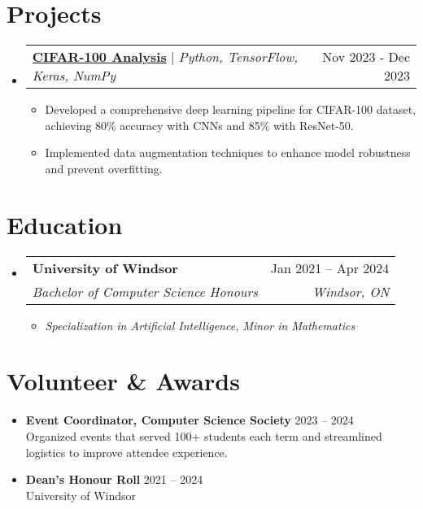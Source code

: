 \documentclass[letterpaper,11pt]{article}
\makeatletter
\newcommand{\resumeItem}[1]{
  \item\small{
    {#1 \vspace{-2pt}}
  }
}
\newcommand{\resumeSubheading}[4]{
  \vspace{-2pt}\item
    \begin{tabular*}{0.97\textwidth}[t]{l@{\extracolsep{\fill}}r}
      \textbf{#1} & #2 \\
      \textit{\small#3} & \textit{\small #4} \\
    \end{tabular*}\vspace{-7pt}
}
\newcommand{\resumeProjectHeading}[2]{
    \item
    \begin{tabular*}{0.97\textwidth}{l@{\extracolsep{\fill}}r}
      \small#1 & #2 \\
    \end{tabular*}\vspace{-7pt}
}
\newcommand{\resumeSubHeadingListStart}{\begin{itemize}[leftmargin=0.15in, label={}]}
\newcommand{\resumeSubHeadingListEnd}{\end{itemize}}
\newcommand{\resumeItemListStart}{\begin{itemize}}
\newcommand{\resumeItemListEnd}{\end{itemize}\vspace{-5pt}}
\makeatother
\begin{document}
\section{Projects}
  \resumeSubHeadingListStart
    \resumeProjectHeading
        {\href{https://github.com/Cyoger/CIFAR-100-Deep-learning-analysis}{\textbf{CIFAR-100 Analysis}} $|$ \emph{Python, TensorFlow, Keras, NumPy}}{Nov 2023 - Dec 2023}
          \resumeItemListStart
            \resumeItem{Developed a comprehensive deep learning pipeline for CIFAR-100 dataset, achieving 80\% accuracy with CNNs and 85\% with ResNet-50.}
            \resumeItem{Implemented data augmentation techniques to enhance model robustness and prevent overfitting.}
          \resumeItemListEnd
  \resumeSubHeadingListEnd 

  \section{Education}
  \resumeSubHeadingListStart
    \resumeSubheading
      {University of Windsor}{Jan 2021 -- Apr 2024}
      {Bachelor of Computer Science Honours}{Windsor, ON}
    \resumeItemListStart
      \resumeItem{\textit{Specialization in Artificial Intelligence, Minor in Mathematics}}
    \resumeItemListEnd
    
  \resumeSubHeadingListEnd  

\section{Volunteer \& Awards}
\resumeItemListStart
  \resumeItem{\textbf{Event Coordinator, Computer Science Society} \hfill 2023 -- 2024\\
              Organized events that served 100+ students each term and streamlined logistics to improve attendee experience.}
  \resumeItem{\textbf{Dean's Honour Roll} \hfill 2021 -- 2024\\
              University of Windsor}
\resumeItemListEnd

\end{document}
